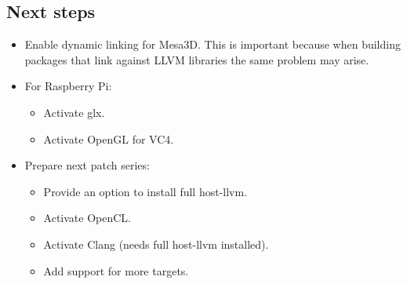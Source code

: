 \documentclass[12pt,a4paper,oneside]{article}
\begin{document}
\subsection*{Next steps}
\begin{itemize}
  \item Enable dynamic linking for Mesa3D. This is important because when building
        packages that link against LLVM libraries the same problem may arise.
  \item For Raspberry Pi:
    \begin{itemize}
      \item Activate glx.
      \item Activate OpenGL for VC4.
    \end{itemize}
  \item Prepare next patch series:
  \begin{itemize}
    \item Provide an option to install full host-llvm.
    \item Activate OpenCL.
    \item Activate Clang (needs full host-llvm installed).
    \item Add support for more targets.
  \end{itemize}
\end{itemize}
\end{document}
